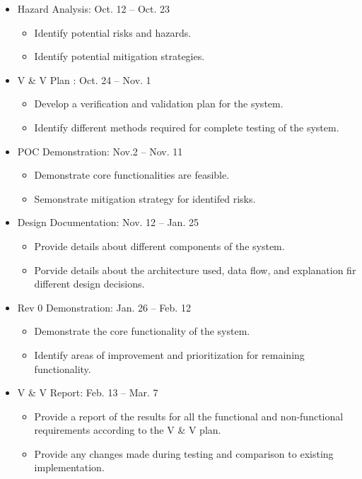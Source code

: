 \documentclass[12pt]{article}
\begin{document}
\begin{itemize}
  \item Hazard Analysis: Oct. 12 -- Oct. 23  
  \begin{itemize}
    \item Identify potential risks and hazards.
    \item Identify potential mitigation strategies.
  \end{itemize}

  \item V & V Plan : Oct. 24 -- Nov. 1  
  \begin{itemize}
    \item Develop a verification and validation plan for the system.
    \item Identify different methods required for complete testing of the system.
  \end{itemize}

  \item POC Demonstration: Nov.2  -- Nov. 11  
  \begin{itemize}
    \item Demonstrate core functionalities are feasible.
    \item Semonstrate mitigation strategy for identifed risks.
  \end{itemize}

  \item Design Documentation: Nov. 12 -- Jan. 25 
  \begin{itemize}
    \item Provide details about different components of the system.
    \item Porvide details about the architecture used, data flow, and explanation fir different design decisions.
  \end{itemize}

  \item Rev 0 Demonstration: Jan. 26 -- Feb. 12
  \begin{itemize}
    \item Demonstrate the core functionality of the system.
    \item Identify areas of improvement and prioritization for remaining functionality.
  \end{itemize}

  \item V & V Report: Feb. 13 -- Mar. 7 
  \begin{itemize}
    \item Provide a report of the results for all the functional and non-functional requirements according to the V & V plan.
    \item Provide any changes made during testing and comparison to existing implementation.
  \end{itemize}
  

\end{itemize}
\end{document}
